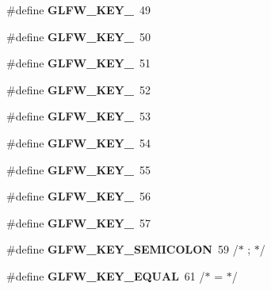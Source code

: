 \begin{DoxyCompactItemize}
\mbox{\label{group__keys_ga05e4cae9ddb8d40cf6d82c8f11f2502f}} 
\#define {\bfseries G\+L\+F\+W\+\_\+\+K\+E\+Y\+\_}~49
\item 
\mbox{\label{group__keys_gadc8e66b3a4c4b5c39ad1305cf852863c}} 
\#define {\bfseries G\+L\+F\+W\+\_\+\+K\+E\+Y\+\_}~50
\item 
\mbox{\label{group__keys_ga812f0273fe1a981e1fa002ae73e92271}} 
\#define {\bfseries G\+L\+F\+W\+\_\+\+K\+E\+Y\+\_}~51
\item 
\mbox{\label{group__keys_ga9e14b6975a9cc8f66cdd5cb3d3861356}} 
\#define {\bfseries G\+L\+F\+W\+\_\+\+K\+E\+Y\+\_}~52
\item 
\mbox{\label{group__keys_ga4d74ddaa5d4c609993b4d4a15736c924}} 
\#define {\bfseries G\+L\+F\+W\+\_\+\+K\+E\+Y\+\_}~53
\item 
\mbox{\label{group__keys_ga9ea4ab80c313a227b14d0a7c6f810b5d}} 
\#define {\bfseries G\+L\+F\+W\+\_\+\+K\+E\+Y\+\_}~54
\item 
\mbox{\label{group__keys_gab79b1cfae7bd630cfc4604c1f263c666}} 
\#define {\bfseries G\+L\+F\+W\+\_\+\+K\+E\+Y\+\_}~55
\item 
\mbox{\label{group__keys_gadeaa109a0f9f5afc94fe4a108e686f6f}} 
\#define {\bfseries G\+L\+F\+W\+\_\+\+K\+E\+Y\+\_}~56
\item 
\mbox{\label{group__keys_ga2924cb5349ebbf97c8987f3521c44f39}} 
\#define {\bfseries G\+L\+F\+W\+\_\+\+K\+E\+Y\+\_}~57
\item 
\mbox{\label{group__keys_ga84233de9ee5bb3e8788a5aa07d80af7d}} 
\#define {\bfseries G\+L\+F\+W\+\_\+\+K\+E\+Y\+\_\+\+S\+E\+M\+I\+C\+O\+L\+ON}~59  /$\ast$ ; $\ast$/
\item 
\mbox{\label{group__keys_gae1a2de47240d6664423c204bdd91bd17}} 
\#define {\bfseries G\+L\+F\+W\+\_\+\+K\+E\+Y\+\_\+\+E\+Q\+U\+AL}~61  /$\ast$ = $\ast$/
\item 
\mbox{\label{group__keys_ga03e842608e1ea323370889d33b8f70ff}} 

\end{DoxyCompactItemize}
